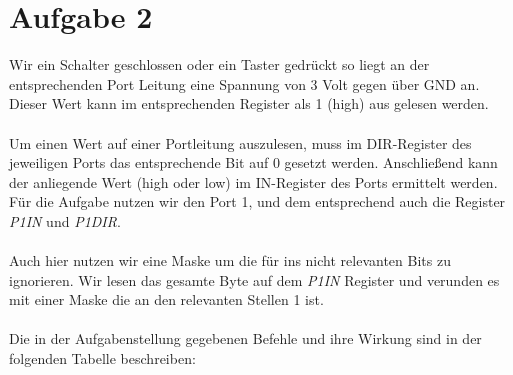 


\section*{Aufgabe 2}

Wir ein Schalter geschlossen oder ein Taster gedrückt so liegt an der entsprechenden Port Leitung eine Spannung von 3 Volt gegen über GND an. Dieser Wert kann im entsprechenden Register als 1 (high) aus gelesen werden.
\paragraph*{}
Um einen Wert auf einer Portleitung auszulesen, muss im DIR-Register des jeweiligen Ports das entsprechende Bit auf 0 gesetzt werden. Anschließend kann der anliegende Wert (high oder low) im IN-Register des Ports ermittelt werden. Für die Aufgabe nutzen wir den Port 1, und dem entsprechend auch die Register {\em P1IN} und {\em P1DIR}.
\paragraph{}
Auch hier nutzen wir eine Maske um die für ins nicht relevanten Bits zu ignorieren. Wir lesen das gesamte Byte auf dem {\em P1IN} Register und verunden es mit einer Maske die an den relevanten Stellen 1 ist.
\paragraph{} Die in der Aufgabenstellung gegebenen Befehle und 
ihre Wirkung sind in der folgenden Tabelle beschreiben:

\lstset{
	frame=none,
	}

